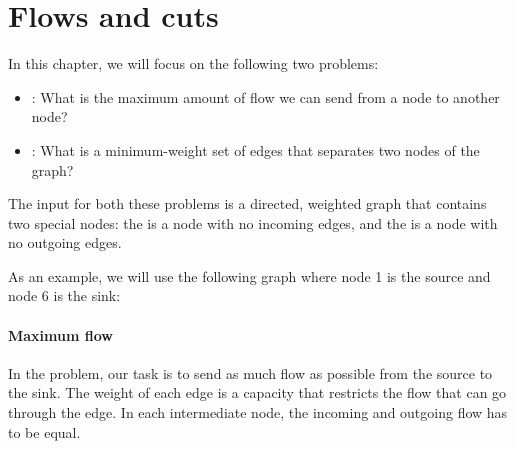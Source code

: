 \chapter{Flows and cuts}

In this chapter, we will focus on the following
two problems:

\begin{itemize}
\item {}:
What is the maximum amount of flow we can
send from a node to another node?
\item {}:
What is a minimum-weight set of edges
that separates two nodes of the graph?
\end{itemize}

The input for both these problems is a directed,
weighted graph that contains two special nodes:
the  is a node with no incoming edges,
and the  is a node with no outgoing edges.

As an example, we will use the following graph
where node 1 is the source and node 6
is the sink:

\begin{center}
\end{center}

\subsubsection{Maximum flow}


In the  problem,
our task is to send as much flow as possible
from the source to the sink.
The weight of each edge is a capacity that
restricts the flow
that can go through the edge.
In each intermediate node,
the incoming and outgoing
flow has to be equal.

